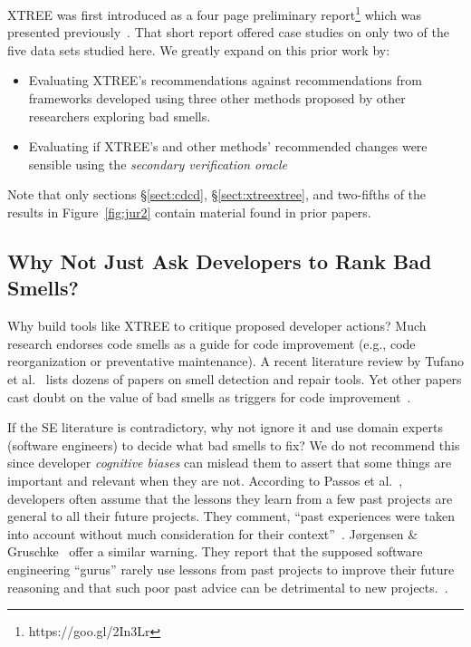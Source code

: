 \documentclass[twocolumn,5p]{elsarticle}
\newcommand{\bi}{\begin{itemize}[leftmargin=0.4cm]}
\newcommand{\ei}{\end{itemize}}
\newcommand{\tion}[1]{\S\ref{sect:#1}}
\newcommand{\fig}[1]{Figure~\ref{fig:#1}}
\theoremstyle{break}
\begin{document}
	XTREE was first introduced as a four page preliminary 
	report\footnote{https://goo.gl/2In3Lr} which was presented 
	previously~\cite{krishna2015actionable}. That short report offered case 
	studies on only two  of
	the five data sets studied here. We greatly expand on this prior work by:
	\bi
	\item
	Evaluating XTREE's recommendations against recommendations from frameworks 
	developed using three other methods proposed by other researchers exploring 
	bad 
	smells.
	\item
	Evaluating if XTREE's and other methods' recommended changes were sensible 
	using the {\em secondary verification oracle}
	\ei
	Note that only sections \tion{cdcd}, \tion{xtreextree}, and two-fifths of the results 
	in \fig{jur2} 
	contain material
	found in prior papers.
	
	
	
	\subsection{Why Not Just Ask Developers to Rank Bad 
	Smells?}\label{sect:prelim}
	
	Why build tools like XTREE to  critique proposed developer actions?
	Much research endorses code smells as a guide for
	code improvement (e.g., code reorganization or preventative maintenance). 
	A 
	recent literature review by Tufano et al.~\cite{Tufano2015}
	lists dozens of papers on smell detection and repair tools.
	Yet
	other papers cast doubt on the value of bad smells
	as triggers for code 
	improvement~\cite{Mantyla2004,Yamashita2013,Sjoberg2013}.
	
	If the SE literature is contradictory, why not ignore it and use domain 
	experts (software engineers) to decide
	what bad smells to fix? We do not recommend this since developer {\em 
	cognitive biases} can mislead them to
	assert that some things are important and relevant when they are not.
	According to Passos et al.~\cite{passos11},  developers often  assume that 
	the lessons they learn from a few past projects are general to all their 
	future projects. They comment, ``past experiences were taken into account 
	without much consideration for their context''~\cite{passos11}.  
	J{\o}rgensen \& Gruschke~\cite{jorgensen09} offer a similar warning. They 
	report that the supposed software engineering ``gurus'' rarely use lessons 
	from past projects to improve their future reasoning and that such poor 
	past advice can be detrimental to new projects.~\cite{jorgensen09}.
\end{document}
